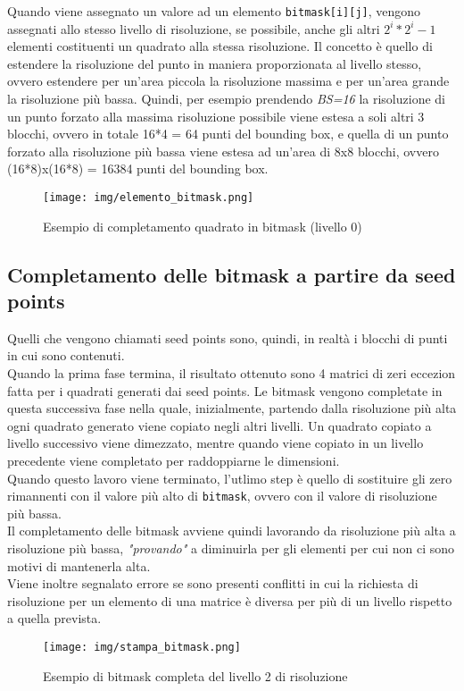 			Quando viene assegnato un valore ad un elemento \texttt{bitmask[i][j]}, vengono assegnati allo stesso livello di risoluzione, se possibile, anche gli altri $2^i * 2^i - 1$ elementi costituenti un quadrato alla stessa risoluzione. Il concetto \`{e} quello di estendere la risoluzione del punto in maniera proporzionata al livello stesso, ovvero estendere per un'area piccola la risoluzione massima e per un'area grande la risoluzione pi\`{u} bassa. Quindi, per esempio prendendo \textit{BS=16} la risoluzione di un punto forzato alla massima risoluzione possibile viene estesa a soli altri 3 blocchi, ovvero in totale 16*4 = 64 punti del bounding box, e quella di un punto forzato alla risoluzione pi\`{u} bassa viene estesa ad un'area di 8x8 blocchi, ovvero (16*8)x(16*8) = 16384 punti del bounding box.  
			\begin{figure}[htbp]
				\centering
				\texttt{[image: img/elemento\_bitmask.png]}
				\caption{Esempio di completamento quadrato in bitmask (livello 0)}
			\end{figure}
		\subsection{Completamento delle bitmask a partire da seed points}
			Quelli che vengono chiamati seed points sono, quindi, in realt\`{a} i blocchi di punti in cui sono contenuti. \\
			Quando la prima fase termina, il risultato ottenuto sono 4 matrici di zeri eccezion fatta per i quadrati generati dai seed points. Le bitmask vengono completate in questa successiva fase nella quale, inizialmente, partendo dalla risoluzione pi\`{u} alta ogni quadrato generato viene copiato negli altri livelli. Un quadrato copiato a livello successivo viene dimezzato, mentre quando viene copiato in un livello precedente viene completato per raddoppiarne le dimensioni.\\
			Quando questo lavoro viene terminato, l'utlimo step \`{e} quello di sostituire gli zero rimannenti con il valore pi\`{u} alto di \texttt{bitmask}, ovvero con il valore di risoluzione pi\`{u} bassa. \\
			Il completamento delle bitmask avviene quindi lavorando da risoluzione pi\`{u} alta a risoluzione pi\`{u} bassa, \textit{"provando"} a diminuirla per gli elementi per cui non ci sono motivi di mantenerla alta. \\
			Viene inoltre segnalato errore se sono presenti conflitti in cui la richiesta di risoluzione per un elemento di una matrice \`{e} diversa per pi\`{u} di un livello rispetto a quella prevista. 
			\begin{figure}[htbp]
				\centering
				\texttt{[image: img/stampa\_bitmask.png]}
				\caption{Esempio di bitmask completa del livello 2 di risoluzione}
			\end{figure} 

